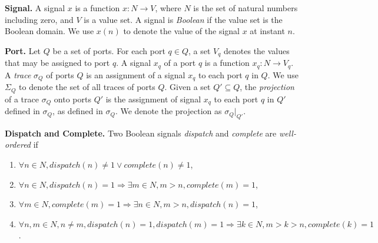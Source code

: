 {\bf Signal.}
A signal $x$ is a function $x: N \rightarrow V$, where $N$ is the set of natural numbers including zero, and $V$ is a value set. 
A signal is \emph{Boolean} if the value set is the Boolean domain.
We use $x(n)$ to denote the value of the signal $x$ at instant $n$. 

{\bf Port.}
Let $Q$  be a set of ports. 
For each port $q \in Q$, a set $V_q$ denotes the values that may be assigned to port $q$. %
A signal $x_q$ of a port $q$ is a function $x_q: N \rightarrow V_q$.
A \emph{trace} $\sigma_Q$ of ports $Q$ is an assignment of a signal $x_q$ to each port $q$ in $Q$.
We use $\Sigma_Q$ to denote the set of all traces of ports $Q$.
Given a set $Q' \subseteq Q$, the \emph{projection} of a trace $\sigma_Q$ onto ports $Q'$ is the assignment of signal $x_q$ to each port $q$ in $Q'$ defined in $\sigma_Q$, as defined in $\sigma_Q$. We denote the projection as $\sigma_Q|_{Q'}$.   
 
{\bf Dispatch and Complete.}
Two Boolean signals \emph{dispatch} and \emph{complete} are \emph{well-ordered} if 

\begin{enumerate}
	\item $\forall n \in N, dispatch(n) \ne 1 \vee complete(n) \ne 1 $,
	\item $ \forall n\in N, dispatch(n) = 1 \Rightarrow \exists m\in N, m > n, complete(m) =  1 $,
	\item $ \forall m\in N, complete(m) = 1 \Rightarrow \exists n\in N, m > n, dispatch(n) =  1 $,
	\item $ \forall n,m\in N, n \neq m, dispatch(n) = 1, dispatch(m) = 1 \Rightarrow \exists k\in N, m >k> n, complete(k) = 1 $.
\end{enumerate}

